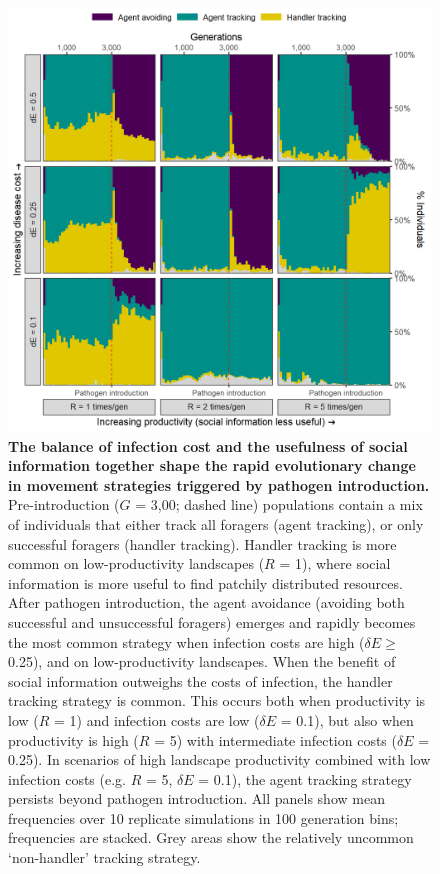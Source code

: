 \begin{figure}[!h]
    \centering
    \includegraphics[width=0.8\linewidth]{figures/pathomove/fig_05.png}
    \caption{
        \textbf{The balance of infection cost and the usefulness of social information together shape the rapid evolutionary change in movement strategies triggered by pathogen introduction.}
        Pre-introduction ($G$ = 3,00; dashed line) populations contain a mix of individuals that either track all foragers (agent tracking), or only successful foragers (handler tracking).
        Handler tracking is more common on low-productivity landscapes ($R$ = 1), where social information is more useful to find patchily distributed resources.
        After pathogen introduction, the agent avoidance (avoiding both successful and unsuccessful foragers) emerges and rapidly becomes the most common strategy when infection costs are high ($\delta E \geq$ 0.25), and on low-productivity landscapes.
        When the benefit of social information outweighs the costs of infection, the handler tracking strategy is common.
        This occurs both when productivity is low ($R$ = 1) and infection costs are low ($\delta E$ = 0.1), but also when productivity is high ($R$ = 5) with intermediate infection costs ($\delta E$ = 0.25).
        In scenarios of high landscape productivity combined with low infection costs (e.g. $R$ = 5, $\delta E$ = 0.1), the agent tracking strategy persists beyond pathogen introduction.
        All panels show mean frequencies over 10 replicate simulations in 100 generation bins; frequencies are stacked.
        Grey areas show the relatively uncommon `non-handler' tracking strategy.
    }\label{fig5}
\end{figure}

